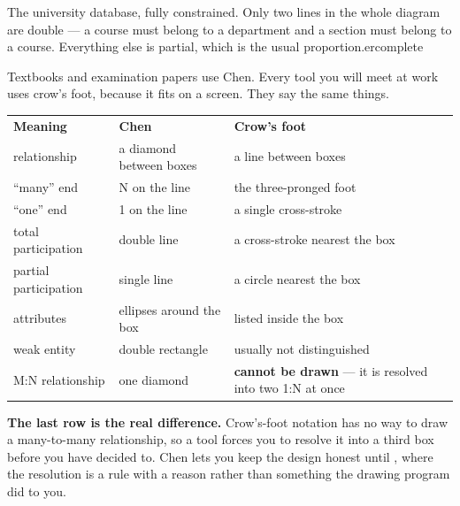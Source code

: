 {}%
{The university database, fully constrained. Only two lines in the whole
diagram are double --- a course must belong to a department and a section must
belong to a course. Everything else is partial, which is the usual
proportion.}{ercomplete}

\begin{conceptbox}
Textbooks and examination papers use Chen. Every tool you will meet at work
uses crow's foot, because it fits on a screen. They say the same things.

\medskip
\begin{tabular}{@{}L{4.4cm}L{4.6cm}L{4.7cm}@{}}
\textbf{Meaning} & \textbf{Chen} & \textbf{Crow's foot} \\
relationship & a diamond between boxes & a line between boxes \\
``many'' end & N on the line & the three-pronged foot \\
``one'' end & 1 on the line & a single cross-stroke \\
total participation & double line & a cross-stroke nearest the box \\
partial participation & single line & a circle nearest the box \\
attributes & ellipses around the box & listed inside the box \\
weak entity & double rectangle & usually not distinguished \\
M:N relationship & one diamond & \textbf{cannot be drawn} --- it is
resolved into two 1:N at once \\
\end{tabular}

\smallskip
\textbf{The last row is the real difference.} Crow's-foot notation has no way
to draw a many-to-many relationship, so a tool forces you to resolve it into a
third box before you have decided to. Chen lets you keep the design honest
until , where the resolution is a rule with a reason rather
than something the drawing program did to you.
\end{conceptbox}

